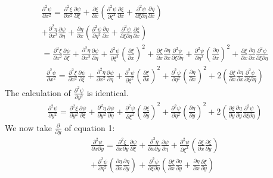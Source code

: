 \documentclass[a4paper,10pt]{article}
\begin{document}
\begin{gather*}
\frac{\partial ^2 \psi}{\partial x^2} = \frac{\partial ^2 \xi}{\partial x^2}\frac{\partial \psi}{\partial \xi}
+\frac{\partial \xi}{\partial x}(\frac{\partial ^2 \psi}{\partial \xi^2}\frac{\partial \xi}{\partial x}+
\frac{\partial ^2 \psi}{\partial \xi \partial \eta}\frac{\partial \eta}{\partial x})\\
+\frac{\partial ^2 \eta}{\partial x^2}\frac{\partial \psi}{\partial \eta}
+\frac{\partial \eta}{\partial x}(\frac{\partial ^2 \psi}{\partial \eta^2}\frac{\partial \eta}{\partial x}+
\frac{\partial ^2 \psi}{\partial \xi \partial \eta}\frac{\partial \xi}{\partial x})\\
=\frac{\partial ^2 \xi}{\partial x^2}\frac{\partial \psi}{\partial \xi}+\frac{\partial ^2 \eta}{\partial x^2}\frac{\partial \psi}{\partial \eta}
+\frac{\partial ^2 \psi}{\partial \xi ^2}(\frac{\partial \xi}{\partial x})^2 +\frac{\partial \xi}{\partial x}\frac{\partial \eta}{\partial x}
\frac{\partial ^2 \psi}{\partial \xi \partial \eta}+\frac{\partial ^2 \psi}{\partial \eta ^2}(\frac{\partial \eta}{\partial x})^2
+\frac{\partial \xi}{\partial x}\frac{\partial \eta}{\partial x}\frac{\partial ^2 \psi}{\partial \xi \partial \eta}
\end{gather*}
\begin{gather}
\frac{\partial ^2 \psi}{\partial x^2}=\frac{\partial ^2 \xi}{\partial x^2}\frac{\partial \psi}{\partial \xi}+\frac{\partial ^2 \eta}{\partial x^2}
\frac{\partial \psi}{\partial \eta}
+\frac{\partial ^2 \psi}{\partial \xi ^2}(\frac{\partial \xi}{\partial x})^2+\frac{\partial ^2 \psi}{\partial \eta ^2}(\frac{\partial \eta}{\partial x})^2
+2(\frac{\partial \xi}{\partial x}\frac{\partial \eta}{\partial x}\frac{\partial ^2 \psi}{\partial \xi \partial \eta})
\end{gather}
The calculation of $\frac{\partial ^2 \psi }{\partial y^2}$ is identical.
\begin{gather}
\frac{\partial ^2 \psi}{\partial y^2}=\frac{\partial ^2 \xi}{\partial y^2}\frac{\partial \psi}{\partial \xi}+\frac{\partial ^2 \eta}{\partial y^2}\frac{\partial \psi}{\partial \eta}
+\frac{\partial ^2 \psi}{\partial \xi ^2}(\frac{\partial \xi}{\partial y})^2+\frac{\partial ^2 \psi}{\partial \eta ^2}(\frac{\partial \eta}{\partial y})^2
+2(\frac{\partial \xi}{\partial y}\frac{\partial \eta}{\partial y}\frac{\partial ^2 \psi}{\partial \xi \partial \eta})
\end{gather}
We now take $\frac{\partial}{\partial y}$ of equation 1:
\begin{multline}
 \frac{\partial ^2\psi}{\partial x \partial y}=\frac{\partial ^2\xi}{\partial x \partial y}\frac{\partial \psi}{\partial \xi}
 +\frac{\partial ^2 \eta}{\partial x \partial y}\frac{\partial \psi}{\partial \eta}
 +\frac{\partial^2 \psi}{\partial \xi ^2}(\frac{\partial \xi}{\partial x}\frac{\partial \xi}{\partial y})\\
 +\frac{\partial^2 \psi}{\partial \eta ^2}(\frac{\partial \eta}{\partial x}\frac{\partial \eta}{\partial y})
 +\frac{\partial ^2 \psi}{\partial \xi \partial \eta}(\frac{\partial \xi}{\partial x}\frac{\partial \eta}{\partial y}+\frac{\partial \eta}{\partial x}\frac{\partial \xi}{\partial y} ) 
\end{multline}
\end{document}
